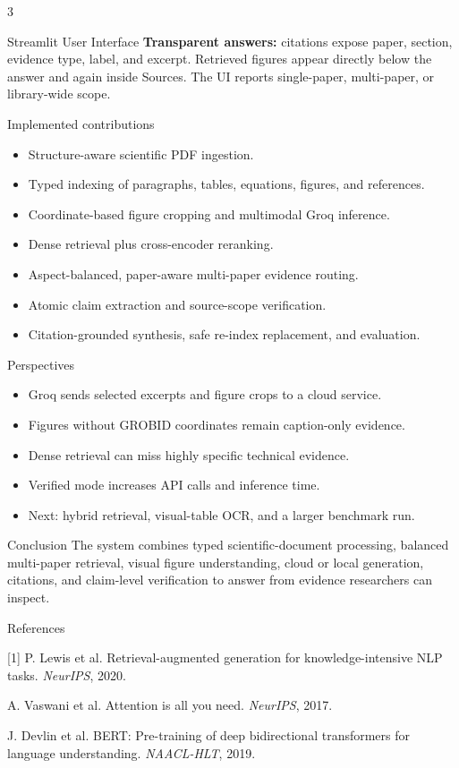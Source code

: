 \documentclass[a0,portrait]{a0poster}
\begin{document}
\begin{multicols}{3}
\begin{posterbox}{Streamlit User Interface}
\textbf{Transparent answers:} citations expose paper, section, evidence type,
label, and excerpt. Retrieved figures appear directly below the answer and again
inside Sources. The UI reports single-paper, multi-paper, or library-wide scope.
\end{posterbox}

\begin{posterbox}{Implemented contributions}
\begin{itemize}
  \item Structure-aware scientific PDF ingestion.
  \item Typed indexing of paragraphs, tables, equations, figures, and references.
  \item Coordinate-based figure cropping and multimodal Groq inference.
  \item Dense retrieval plus cross-encoder reranking.
  \item Aspect-balanced, paper-aware multi-paper evidence routing.
  \item Atomic claim extraction and source-scope verification.
  \item Citation-grounded synthesis, safe re-index replacement, and evaluation.
\end{itemize}
\end{posterbox}

\begin{posterbox}{Perspectives}
\begin{itemize}
  \item Groq sends selected excerpts and figure crops to a cloud service.
  \item Figures without GROBID coordinates remain caption-only evidence.
  \item Dense retrieval can miss highly specific technical evidence.
  \item Verified mode increases API calls and inference time.
  \item Next: hybrid retrieval, visual-table OCR, and a larger benchmark run.
\end{itemize}
\end{posterbox}

\begin{posterbox}{Conclusion}
\color{ReferenceOrange}
The system combines typed scientific-document processing, balanced multi-paper
retrieval, visual figure understanding, cloud or local generation, citations,
and claim-level verification to answer from evidence researchers can inspect.
\color{black}
\end{posterbox}

\begin{posterbox}{References}
{\footnotesize
[1] P. Lewis et al. Retrieval-augmented generation for knowledge-intensive NLP
tasks. \textit{NeurIPS}, 2020.\par
[2] A. Vaswani et al. Attention is all you need. \textit{NeurIPS}, 2017.\par
[3] J. Devlin et al. BERT: Pre-training of deep bidirectional transformers for
language understanding. \textit{NAACL-HLT}, 2019.}
\end{posterbox}

\end{multicols}
\normalsize
\end{document}
